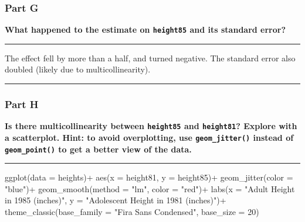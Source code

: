 \documentclass[
]{article}
\newenvironment{Shaded}{\begin{snugshade}}{\end{snugshade}}
\newcommand{\AttributeTok}[1]{\textcolor[rgb]{0.77,0.63,0.00}{#1}}
\newcommand{\DecValTok}[1]{\textcolor[rgb]{0.00,0.00,0.81}{#1}}
\newcommand{\FunctionTok}[1]{\textcolor[rgb]{0.00,0.00,0.00}{#1}}
\newcommand{\NormalTok}[1]{#1}
\newcommand{\SpecialCharTok}[1]{\textcolor[rgb]{0.00,0.00,0.00}{#1}}
\newcommand{\StringTok}[1]{\textcolor[rgb]{0.31,0.60,0.02}{#1}}
\begin{document}
\hypertarget{part-g-1}{%
\subsubsection{Part G}\label{part-g-1}}

\textbf{What happened to the estimate on \texttt{height85} and its
standard error?}

\begin{center}\rule{0.5\linewidth}{0.5pt}\end{center}

The effect fell by more than a half, and turned negative. The standard
error also doubled (likely due to multicollinearity).

\begin{center}\rule{0.5\linewidth}{0.5pt}\end{center}

\hypertarget{part-h-1}{%
\subsubsection{Part H}\label{part-h-1}}

\textbf{Is there multicollinearity between \texttt{height85} and
\texttt{height81}? Explore with a scatterplot. Hint: to avoid
overplotting, use \texttt{geom\_jitter()} instead of
\texttt{geom\_point()} to get a better view of the data.}

\begin{center}\rule{0.5\linewidth}{0.5pt}\end{center}

\begin{Shaded}
\begin{Highlighting}[]
\FunctionTok{ggplot}\NormalTok{(}\AttributeTok{data =}\NormalTok{ heights)}\SpecialCharTok{+}
  \FunctionTok{aes}\NormalTok{(}\AttributeTok{x =}\NormalTok{ height81, }\AttributeTok{y =}\NormalTok{ height85)}\SpecialCharTok{+}
  \FunctionTok{geom\_jitter}\NormalTok{(}\AttributeTok{color =} \StringTok{"blue"}\NormalTok{)}\SpecialCharTok{+}
  \FunctionTok{geom\_smooth}\NormalTok{(}\AttributeTok{method =} \StringTok{"lm"}\NormalTok{, }\AttributeTok{color =} \StringTok{"red"}\NormalTok{)}\SpecialCharTok{+}
  \FunctionTok{labs}\NormalTok{(}\AttributeTok{x =} \StringTok{"Adult Height in 1985 (inches)"}\NormalTok{,}
       \AttributeTok{y =} \StringTok{"Adolescent Height in 1981 (inches)"}\NormalTok{)}\SpecialCharTok{+}
  \FunctionTok{theme\_classic}\NormalTok{(}\AttributeTok{base\_family =} \StringTok{"Fira Sans Condensed"}\NormalTok{,}
           \AttributeTok{base\_size =} \DecValTok{20}\NormalTok{)}
\end{Highlighting}
\end{Shaded}
\end{document}
